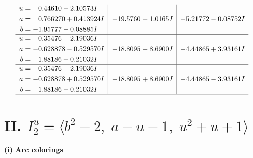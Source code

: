 \documentclass[1p]{elsarticle_modified}
\theoremstyle{definition}
\begin{document}
$$\begin{array}{c|c|c}
\begin{aligned}
u &= \phantom{-}0.44610 - 2.10573 I \\
a &= \phantom{-}0.766270 + 0.413924 I \\
b &= -1.95777 - 0.08885 I\end{aligned}
 & -19.5760 - 1.0165 I & -5.21772 - 0.08752 I \\ \hline\begin{aligned}
u &= -0.35476 + 2.19036 I \\
a &= -0.628878 - 0.529570 I \\
b &= \phantom{-}1.88186 + 0.21032 I\end{aligned}
 & -18.8095 - 8.6900 I & -4.44865 + 3.93161 I \\ \hline\begin{aligned}
u &= -0.35476 - 2.19036 I \\
a &= -0.628878 + 0.529570 I \\
b &= \phantom{-}1.88186 - 0.21032 I\end{aligned}
 & -18.8095 + 8.6900 I & -4.44865 - 3.93161 I\\
 \hline 
 \end{array}$$\newpage\newpage\renewcommand{\arraystretch}{1}
\centering \section*{II. $I^u_{2}= \langle b^2-2,\;a- u-1,\;u^2+u+1 \rangle$}
\flushleft \textbf{(i) Arc colorings}\\
\end{document}
